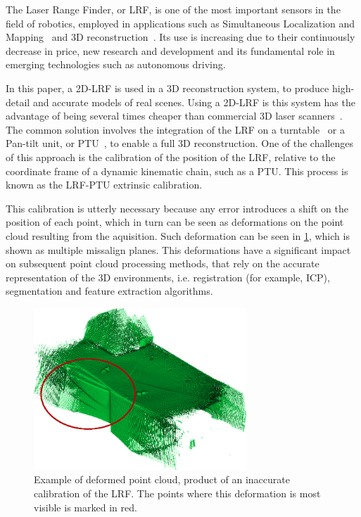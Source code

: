 \documentclass[conference]{IEEEtran}
\begin{document}
The Laser Range Finder, or LRF, is one of the most important sensors in the field of robotics, employed in applications such as Simultaneous Localization and Mapping~\cite{wang14,eyice18} and 3D reconstruction~\cite{saito10}. Its use is increasing due to their continuously decrease in price, new research and development and its fundamental role in emerging technologies such as autonomous driving.

In this paper, a 2D-LRF is used in a 3D reconstruction system, to produce high-detail and accurate models of real scenes. Using a 2D-LRF is this system has the advantage of being several times cheaper than commercial 3D laser scanners~\cite{dias06}. The common solution involves the integration of the LRF on a turntable~\cite{maurelli09} or a Pan-tilt unit, or PTU~\cite{klimentjew09}, to enable a full 3D reconstruction. One of the challenges of this approach is the calibration of the position of the LRF, relative to the coordinate frame of a dynamic kinematic chain, such as a PTU. This process is known as the LRF-PTU extrinsic calibration.

This calibration is utterly necessary because any error introduces a shift on the position of each point, which in turn can be seen as deformations on the point cloud resulting from the aquisition. Such deformation can be seen in \cref{fig:deformed-pointcloud}, which is shown as multiple missalign planes. This deformations have a significant impact on subsequent point cloud processing methods, that rely on the accurate representation of the 3D environments, i.e. registration (for example, ICP), segmentation and feature extraction algorithms. 

\begin{figure}[h]
    \centering
    \includegraphics[width=8cm]{images/bad-pointcloud.png}
    \caption{Example of deformed point cloud, product of an inaccurate calibration of the LRF. The points where this deformation is most visible is marked in red.}
    \label{fig:deformed-pointcloud}
\end{figure}
\end{document}
